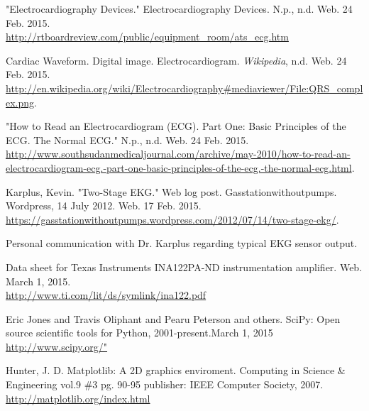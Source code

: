 \documentclass[11pt, oneside]{article}   	%
\begin{document}
\begin{thebibliography}{12}

"Electrocardiography Devices." Electrocardiography Devices. N.p., n.d. Web. 24 Feb. 2015. \\ \url{http://rtboardreview.com/public/equipment_room/ats_ecg.htm}

Cardiac Waveform. Digital image. Electrocardiogram. \textit{Wikipedia}, n.d. Web. 24 Feb. 2015. \\ \url{http://en.wikipedia.org/wiki/Electrocardiography#mediaviewer/File:QRS_complex.png}.

"How to Read an Electrocardiogram (ECG). Part One: Basic Principles of the ECG. The Normal ECG." N.p., n.d. Web. 24 Feb. 2015. \\ \url{http://www.southsudanmedicaljournal.com/archive/may-2010/how-to-read-an-electrocardiogram-ecg.-part-one-basic-principles-of-the-ecg.-the-normal-ecg.html}.

Karplus, Kevin. "Two-Stage EKG." Web log post. Gasstationwithoutpumps. Wordpress, 14 July 2012. Web. 17 Feb. 2015. \\ \url{https://gasstationwithoutpumps.wordpress.com/2012/07/14/two-stage-ekg/}.

Personal communication with Dr. Karplus regarding typical EKG sensor output.

Data sheet for Texas Instruments INA122PA-ND instrumentation amplifier. Web. March 1, 2015.\\ \url{http://www.ti.com/lit/ds/symlink/ina122.pdf}

Eric Jones and Travis Oliphant and Pearu Peterson and others. SciPy: Open source scientific tools for Python, 2001-present.March 1, 2015
\url{http://www.scipy.org/"}

Hunter, J. D. Matplotlib: A 2D graphics enviroment.
Computing in Science \& Engineering vol.9 \#3 pg. 90-95
publisher: IEEE Computer Society, 2007. \url{http://matplotlib.org/index.html}



\end{thebibliography}
\end{document}
